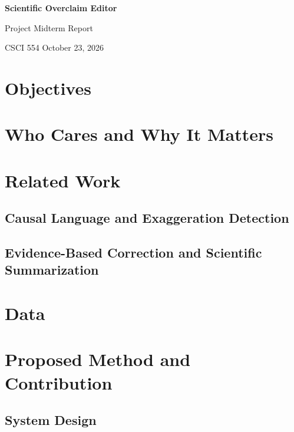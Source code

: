 \documentclass[10pt,letterpaper]{article}
\begin{document}
\begin{center}
{\Large\bfseries Scientific Overclaim Editor\par}
\vspace{4pt}
{\large Project Midterm Report\par}
\vspace{4pt}
CSCI 554 \hfill October 23, 2026
\end{center}
\section{Objectives}
\vspace*{1.1in}
\section{Who Cares and Why It Matters}
\vspace*{1.0in}
\section{Related Work}
\subsection{Causal Language and Exaggeration Detection}
\vspace*{0.65in}
\subsection{Evidence-Based Correction and Scientific Summarization}

\clearpage
\section{Data}
\label{sec:data}


\clearpage
\section{Proposed Method and Contribution}
\subsection{System Design}
\vspace*{0.65in}
\end{document}
